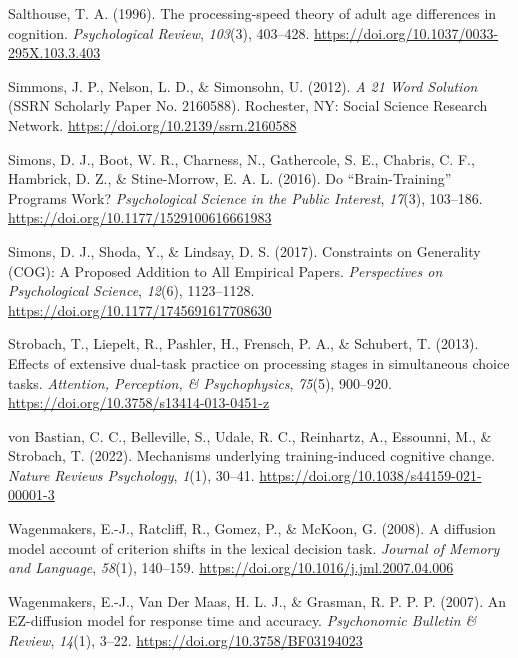 \documentclass[
  man, donotrepeattitle,floatsintext]{apa6}
\newlength{\cslhangindent}
\newenvironment{CSLReferences}[2] %
 {\begin{list}{}{%
  \setlength{\itemindent}{0pt}
  \setlength{\leftmargin}{0pt}
  \setlength{\parsep}{0pt}
  \ifodd #1
   \setlength{\leftmargin}{\cslhangindent}
   \setlength{\itemindent}{-1\cslhangindent}
  \fi
  \setlength{\itemsep}{#2\baselineskip}}}
 {\end{list}}
\begin{document}
\begin{CSLReferences}{1}{0}
Salthouse, T. A. (1996). The processing-speed theory of adult age differences in cognition. \emph{Psychological Review}, \emph{103}(3), 403--428. \url{https://doi.org/10.1037/0033-295X.103.3.403}

Simmons, J. P., Nelson, L. D., \& Simonsohn, U. (2012). \emph{A 21 {Word Solution}} (SSRN Scholarly Paper No. 2160588). Rochester, NY: Social Science Research Network. \url{https://doi.org/10.2139/ssrn.2160588}

Simons, D. J., Boot, W. R., Charness, N., Gathercole, S. E., Chabris, C. F., Hambrick, D. Z., \& Stine-Morrow, E. A. L. (2016). Do {``{Brain-Training}''} {Programs Work}? \emph{Psychological Science in the Public Interest}, \emph{17}(3), 103--186. \url{https://doi.org/10.1177/1529100616661983}

Simons, D. J., Shoda, Y., \& Lindsay, D. S. (2017). Constraints on {Generality} ({COG}): {A Proposed Addition} to {All Empirical Papers}. \emph{Perspectives on Psychological Science}, \emph{12}(6), 1123--1128. \url{https://doi.org/10.1177/1745691617708630}

Strobach, T., Liepelt, R., Pashler, H., Frensch, P. A., \& Schubert, T. (2013). Effects of extensive dual-task practice on processing stages in simultaneous choice tasks. \emph{Attention, Perception, \& Psychophysics}, \emph{75}(5), 900--920. \url{https://doi.org/10.3758/s13414-013-0451-z}

von Bastian, C. C., Belleville, S., Udale, R. C., Reinhartz, A., Essounni, M., \& Strobach, T. (2022). Mechanisms underlying training-induced cognitive change. \emph{Nature Reviews Psychology}, \emph{1}(1), 30--41. \url{https://doi.org/10.1038/s44159-021-00001-3}

Wagenmakers, E.-J., Ratcliff, R., Gomez, P., \& McKoon, G. (2008). A diffusion model account of criterion shifts in the lexical decision task. \emph{Journal of Memory and Language}, \emph{58}(1), 140--159. \url{https://doi.org/10.1016/j.jml.2007.04.006}

Wagenmakers, E.-J., Van Der Maas, H. L. J., \& Grasman, R. P. P. P. (2007). An {EZ-diffusion} model for response time and accuracy. \emph{Psychonomic Bulletin \& Review}, \emph{14}(1), 3--22. \url{https://doi.org/10.3758/BF03194023}


\end{CSLReferences}
\end{document}
